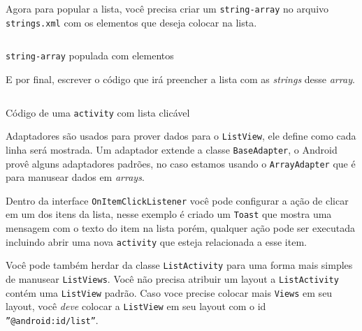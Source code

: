 \documentclass[a4paper,12pt,brazil,doubleside]{book}
\begin{document}
\begin{singlespace}
Agora para popular a lista, você precisa criar um \texttt{string-array} no arquivo \texttt{\textcolor{mygreen}{strings.xml}} com os elementos que deseja colocar na lista.

\begin{listing}[H]
\inputminted[linenos=true,fontsize=\small,frame=lines, framesep=2mm, tabsize=2,numbersep=5pt]{xml}{src/design/string-array.xml}
\caption{\texttt{string-array} populada com elementos}
\end{listing}

E por final, escrever o código que irá preencher a lista com as \textit{strings} desse \textit{array}.

\begin{listing}[H]
\inputminted[linenos=true,fontsize=\small,frame=lines, framesep=2mm, tabsize=2,numbersep=5pt]{java}{src/design/listactivity.java}
\caption{Código de uma \texttt{activity} com lista clicável}
\end{listing}

Adaptadores são usados para prover dados para o \texttt{ListView}, ele define como cada linha será mostrada. Um adaptador extende a classe \texttt{BaseAdapter}, o Android provê alguns adaptadores padrões, no caso estamos usando o \texttt{ArrayAdapter} que é para manusear dados em \textit{arrays}.

Dentro da interface \texttt{OnItemClickListener} você pode configurar a ação de clicar em um dos itens da lista, nesse exemplo é criado um \texttt{Toast} que mostra uma mensagem com o texto do item na lista porém, qualquer ação pode ser executada incluindo abrir uma nova \texttt{activity} que esteja relacionada a esse item.

Você pode também herdar da classe \texttt{ListActivity} para uma forma mais simples de manusear \texttt{ListViews}. Você não precisa atribuir um layout a \texttt{ListActivity} contém uma \texttt{ListView} padrão. Caso voce precise colocar mais \texttt{Views} em seu layout, você \emph{deve} colocar a \texttt{ListView} em seu layout com o id \texttt{''@android:id/list''}.


\end{singlespace}
\end{document}
